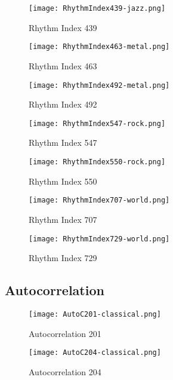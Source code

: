 \documentclass{article} %
\begin{document}
\begin{figure}[H]
\centering
\texttt{[image: RhythmIndex439-jazz.png]}
\caption{Rhythm Index 439}
\label{fig:rhy439_1}
\end{figure}

\begin{figure}[H]
\centering
\texttt{[image: RhythmIndex463-metal.png]}
\caption{Rhythm Index 463}
\label{fig:rhy463_1}
\end{figure}

\begin{figure}[H]
\centering
\texttt{[image: RhythmIndex492-metal.png]}
\caption{Rhythm Index 492}
\label{fig:rhy492_1}
\end{figure}

\begin{figure}[H]
\centering
\texttt{[image: RhythmIndex547-rock.png]}
\caption{Rhythm Index 547}
\label{fig:rhy547_1}
\end{figure}

\begin{figure}[H]
\centering
\texttt{[image: RhythmIndex550-rock.png]}
\caption{Rhythm Index 550}
\label{fig:rhy550_1}
\end{figure}

\begin{figure}[H]
\centering
\texttt{[image: RhythmIndex707-world.png]}
\caption{Rhythm Index 707}
\label{fig:rhy707_1}
\end{figure}

\begin{figure}[H]
\centering
\texttt{[image: RhythmIndex729-world.png]}
\caption{Rhythm Index 729}
\label{fig:rhy729_1}
\end{figure}
\clearpage



\subsection{Autocorrelation}
\label{sec:autocfig}

\begin{figure}[H]
\centering
\texttt{[image: AutoC201-classical.png]}
\caption{Autocorrelation 201}
\label{fig:auto201_1}
\end{figure}

\begin{figure}[H]
\centering
\texttt{[image: AutoC204-classical.png]}
\caption{Autocorrelation 204}
\label{fig:auto204_1}
\end{figure}
\end{document}
